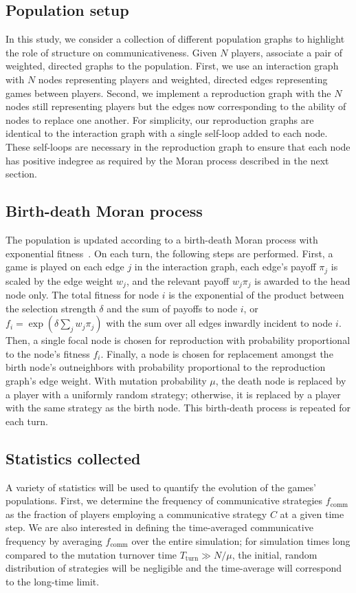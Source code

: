\documentclass[pdflatex,lineno,referee,sn-mathphys-ay]{sn-jnl}
\begin{document}
\subsection{Population setup}
\label{sec:pop_setup}
In this study, we consider a collection of different population graphs
to highlight the role of structure on communicativeness.
Given $N$ players, associate a pair
of weighted, directed graphs to the population.
First, we use an interaction graph with $N$ nodes representing players
and weighted, directed edges representing games between players.
Second, we implement a reproduction graph with the $N$ nodes
still representing players
but the edges now corresponding to the ability of nodes to replace one another.
For simplicity, our reproduction graphs are identical to the interaction graph
with a single self-loop added to each node.
These self-loops are necessary in the reproduction graph
to ensure that each node has positive indegree
as required by the Moran process described in the next section.

\subsection{Birth-death Moran process}
\label{sec:evo_setup}
The population is updated according to a birth-death Moran process
with exponential fitness~\citep[\eg \cf][]{lieberman2005evolutionary}.
On each turn, the following steps are performed.
First, a game is played on each edge $j$ in the interaction graph,
each edge's payoff $\pi_j$ is scaled by the edge weight $w_j$,
and the relevant payoff $w_j \pi_j$ is awarded to the head node only.
The total fitness for node $i$ is the exponential of the product
between the selection strength $\delta$
and the sum of payoffs to node $i$,
or $f_i = \exp(\delta \sum_j w_j \pi_j)$ with the sum
over all edges inwardly incident to node $i$.
Then, a single focal node is chosen for reproduction
with probability proportional to the node's fitness $f_i$.
Finally, a node is chosen for replacement amongst the birth node's outneighbors
with probability proportional to the reproduction graph's edge weight.
With mutation probability $\mu$,
the death node is replaced by a player with a uniformly random strategy;
otherwise, it is replaced by a player with the same strategy as the birth node.
This birth-death process is repeated for each turn.

\subsection{Statistics collected}
\label{sec:stats_setup}
A variety of statistics will be used to quantify the evolution
of the games' populations.
First, we determine the frequency of communicative strategies
$f_{\text{comm}}$ as the fraction of players employing
a communicative strategy $C$ at a given time step.
We are also interested in defining the time-averaged communicative frequency
by averaging $f_{\text{comm}}$ over the entire simulation;
for simulation times long compared to the mutation turnover time
$T_{\text{turn}} \gg N/\mu$,
the initial, random distribution of strategies will be negligible
and the time-average will correspond to the long-time limit.
\end{document}
